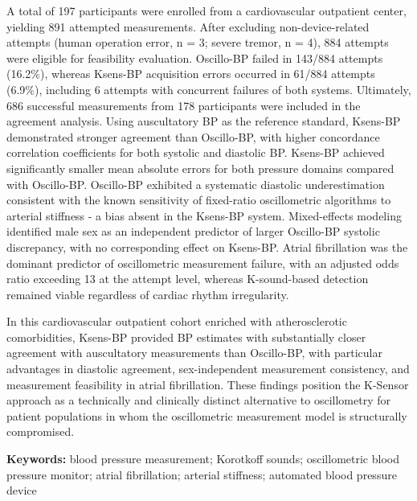 \documentclass[
  12pt,
  letterpaper,
  openany,
  oneside]{book}
\begin{document}
A total of 197 participants were enrolled from a cardiovascular
outpatient center, yielding 891 attempted measurements. After excluding
non-device-related attempts (human operation error, n = 3; severe
tremor, n = 4), 884 attempts were eligible for feasibility evaluation.
Oscillo-BP failed in 143/884 attempts (16.2\%), whereas Ksens-BP
acquisition errors occurred in 61/884 attempts (6.9\%), including 6
attempts with concurrent failures of both systems. Ultimately, 686
successful measurements from 178 participants were included in the
agreement analysis. Using auscultatory BP as the reference standard,
Ksens-BP demonstrated stronger agreement than Oscillo-BP, with higher
concordance correlation coefficients for both systolic and diastolic BP.
Ksens-BP achieved significantly smaller mean absolute errors for both
pressure domains compared with Oscillo-BP. Oscillo-BP exhibited a
systematic diastolic underestimation consistent with the known
sensitivity of fixed-ratio oscillometric algorithms to arterial
stiffness - a bias absent in the Ksens-BP system. Mixed-effects modeling
identified male sex as an independent predictor of larger Oscillo-BP
systolic discrepancy, with no corresponding effect on Ksens-BP. Atrial
fibrillation was the dominant predictor of oscillometric measurement
failure, with an adjusted odds ratio exceeding 13 at the attempt level,
whereas K-sound-based detection remained viable regardless of cardiac
rhythm irregularity.

In this cardiovascular outpatient cohort enriched with atherosclerotic
comorbidities, Ksens-BP provided BP estimates with substantially closer
agreement with auscultatory measurements than Oscillo-BP, with
particular advantages in diastolic agreement, sex-independent
measurement consistency, and measurement feasibility in atrial
fibrillation. These findings position the K-Sensor approach as a
technically and clinically distinct alternative to oscillometry for
patient populations in whom the oscillometric measurement model is
structurally compromised.

\textbf{Keywords:} blood pressure measurement; Korotkoff sounds;
oscillometric blood pressure monitor; atrial fibrillation; arterial
stiffness; automated blood pressure device

\cleardoublepage
{}
{}
\tableofcontents
\cleardoublepage

{}
\listoffigures
\cleardoublepage
\end{document}
